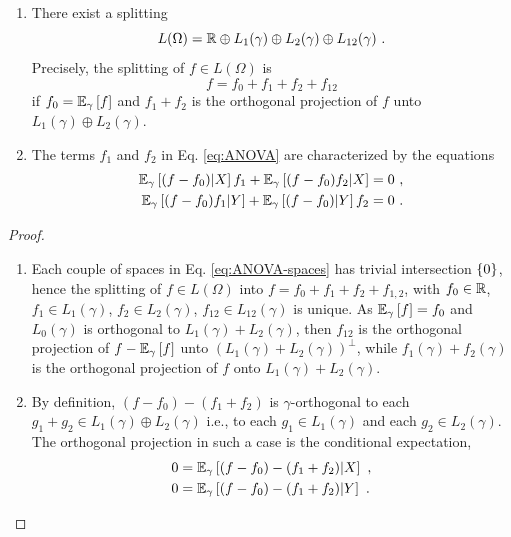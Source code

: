 \documentclass[12pt,a4paper]{amsart}
\begin{document}
\begin{proposition}[ANOVA]
\label{prop:ANOVA}
\begin{enumerate}
\item
There exist a splitting
%
\begin{equation*}
%
  L(\Omega) = \reals \oplus L_1(\gamma) \oplus L_2(\gamma) \oplus L_{12}(\gamma) \ . 
\end{equation*}
%
Precisely, the splitting of $f \in L(\Omega)$ is
%
\begin{equation}
 \label{eq:ANOVA}
 f = f_0 + f_1 + f_2 + f_{12}
\end{equation}
%
 if $f_0={\operatorname{\mathbb E}}_{\gamma}\left[f\right]$ and $f_1+f_2$ is the orthogonal projection of $f$ unto $L_1(\gamma) \oplus L_2(\gamma)$.
\item The terms $f_1$ and $f_2$ in Eq. \eqref{eq:ANOVA} are characterized by the equations
%
\begin{equation}
\label{eq:projetion}
  \begin{aligned}
    \condexpectat \gamma {(f - f_0)} X f_1 + \condexpectat \gamma {(f-f_0)f_2} X &= 0 \ , \\
    \condexpectat \gamma {(f - f_0)f_1} Y + \condexpectat \gamma {(f-f_0)} Y f_2 &= 0 \ .
  \end{aligned}
%
\end{equation}
\end{enumerate}
\end{proposition}

\begin{proof}
\begin{enumerate}
\item Each couple of spaces in Eq. \eqref{eq:ANOVA-spaces} has trivial intersection $\left\{ 0 \right\}$, hence the splitting of $f \in L(\Omega)$ into $f = f_0 + f_1 + f_2 + f_{1,2}$, with $f_0 \in \mathbb R$, $f_1 \in L_1(\gamma)$, $f_2 \in L_2(\gamma)$, $f_{12} \in L_{12}(\gamma)$ is unique. As ${\operatorname{\mathbb E}}_{\gamma}\left[f\right] = f_0$ and $L_0(\gamma)$ is orthogonal to $L_1(\gamma)+L_2(\gamma)$, then $f_{12}$ is the orthogonal projection of $f - {\operatorname{\mathbb E}}_{\gamma}\left[f\right]$ unto $(L_1(\gamma)+L_2(\gamma))^\perp$, while $f_1(\gamma)+f_2(\gamma)$ is the orthogonal projection of $f$ onto $L_1(\gamma)+L_2(\gamma)$.
\item By definition, $(f - f_0) - (f_1 + f_2)$ is $\gamma$-orthogonal to each $g_1+g_2 \in L_1(\gamma)\oplus L_2(\gamma)$ i.e., to each $g_1 \in L_1(\gamma)$ and each $g_2 \in L_2(\gamma)$. The orthogonal projection in such a case is the conditional expectation,
%
  \begin{align*}
    0 &= {\operatorname{\mathbb E}}_{\gamma}\left[(f-f_0) - (f_1+f_2) \middle| X\right]  \ , \\
   0 &= {\operatorname{\mathbb E}}_{\gamma}\left[(f-f_0) - (f_1+f_2) \middle| Y\right] \ .
  \end{align*}
\end{enumerate}
\end{proof}
\end{document}
